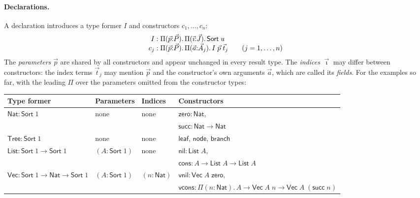 \documentclass[acmsmall,screen,nonacm]{acmart}
\newcommand{\Sort}[1]{\mathsf{Sort}\;#1}
\newcommand{\tPi}[3]{\Pi(#1{:}#2).\,#3}
\newcommand{\Nat}{\mathsf{Nat}}
\newcommand{\zero}{\mathsf{zero}}
\newcommand{\tsucc}{\mathsf{succ}}
\begin{document}
\paragraph{Declarations.}
A declaration introduces a type former $I$ and constructors $c_1, \ldots, c_n$:
\[
\begin{array}{r@{\;}c@{\;}l@{\qquad}l}
I &:& \tPi{\vec{p}}{\vec{P}}{\tPi{\vec{\imath}}{\vec{J}}{\Sort{u}}} & \\
c_j &:& \tPi{\vec{p}}{\vec{P}}{\tPi{\vec{a}}{\vec{A}_j}{I\;\vec{p}\;\vec{t}_j}} & (j = 1, \ldots, n)
\end{array}
\]
The \emph{parameters} $\vec{p}$ are shared by all constructors and appear unchanged in every result type.
The \emph{indices} $\vec{\imath}$ may differ between constructors: the index terms $\vec{t}_j$ may mention $\vec{p}$ and the constructor's own arguments $\vec{a}$, which are called its \emph{fields}.
For the examples so far, with the leading $\Pi$ over the parameters omitted from the constructor types:
\begin{center}
\footnotesize
\renewcommand{\arraystretch}{1.2}
\begin{tabular}{@{}llll@{}}
\toprule
\textbf{Type former} & \textbf{Parameters} & \textbf{Indices} & \textbf{Constructors} \\
\midrule
$\Nat : \Sort{1}$ & none & none & $\zero : \Nat$, \\
& & & $\tsucc : \Nat \to \Nat$ \\
$\mathsf{Tree} : \Sort{1}$ & none & none & $\mathsf{leaf}$, $\mathsf{node}$, $\mathsf{branch}$ \\
$\mathsf{List} : \Sort{1} \to \Sort{1}$ & $(A : \Sort{1})$ & none & $\mathsf{nil} : \mathsf{List}\;A$, \\
& & & $\mathsf{cons} : A \to \mathsf{List}\;A \to \mathsf{List}\;A$ \\
$\mathsf{Vec} : \Sort{1} \to \Nat \to \Sort{1}$ & $(A : \Sort{1})$ & $(n : \Nat)$ & $\mathsf{vnil} : \mathsf{Vec}\;A\;\zero$, \\
& & & $\mathsf{vcons} : \tPi{n}{\Nat}{A \to \mathsf{Vec}\;A\;n \to \mathsf{Vec}\;A\;(\tsucc\;n)}$ \\
\bottomrule
\end{tabular}
\end{center}
\end{document}

